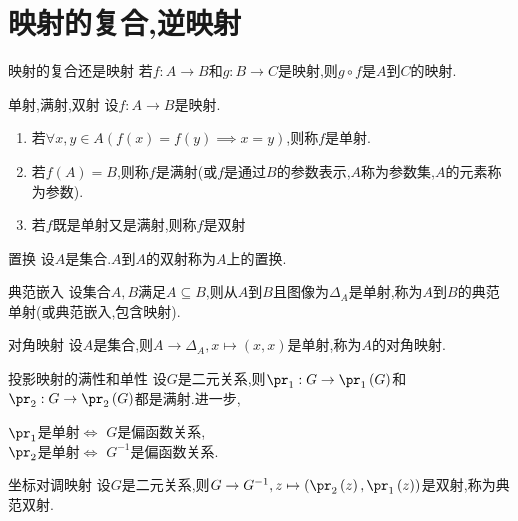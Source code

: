 \section{映射的复合,逆映射}

\begin{proposition}{映射的复合还是映射}{}
	若$f:A\to B$和$g:B\to C$是映射,则$g\circ f$是$A$到$C$的映射.
\end{proposition}

\begin{definition}{单射,满射,双射}{}
	设$f:A\to B$是映射.
	\begin{enumerate}
		\item 若$\forall x,y\in A\left(f\left(x\right)=f\left(y\right)\implies x=y\right)$,则称$f$是单射.
		\item 若$f\left(A\right)=B$,则称$f$是满射(或$f$是通过$B$的参数表示,$A$称为参数集,$A$的元素称为参数).
		\item 若$f$既是单射又是满射,则称$f$是双射
	\end{enumerate}
\end{definition}

\begin{definition}{置换}{}
	设$A$是集合.$A$到$A$的双射称为$A$上的置换.
\end{definition}

\begin{example}{典范嵌入}{}
	设集合$A,B$满足$A\subseteq B$,则从$A$到$B$且图像为$\Delta_{A}$是单射,称为$A$到$B$的典范单射(或典范嵌入,包含映射).
\end{example}

\begin{example}{对角映射}{}
	设$A$是集合,则$A\to\Delta_{A},x\mapsto\left(x,x\right)$是单射,称为$A$的对角映射.
\end{example}

\begin{example}{投影映射的满性和单性}{}
	设$G$是二元关系,则$\pr_{1}:G\to\pr_{1}\left(G\right)$和$\pr_{2}:G\to\pr_{2}\left(G\right)$都是满射.进一步,
	\begin{center}
		$\pr_{1}$是单射$\iff$ $G$是偏函数关系,\\
		$\pr_{2}$是单射$\iff$ $G^{-1}$是偏函数关系.
	\end{center}
\end{example}

\begin{example}{坐标对调映射}{}
	设$G$是二元关系,则$G\to G^{-1},z\mapsto\left(\pr_{2}\left(z\right),\pr_{1}\left(z\right)\right)$是双射,称为典范双射.
\end{example}

